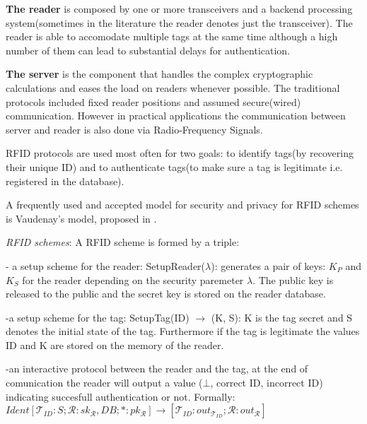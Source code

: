 \vspace*{0.1cm} 
        
        \textbf{The reader} is composed by one or more transceivers and a backend processing system(sometimes in the literature the reader denotes just the transceiver). 
    The reader is able to accomodate multiple tags at the same time although a high number of them can lead to substantial delays for authentication. 
    
\vspace*{0.1cm}

        \textbf{The server} is the component that handles the complex cryptographic calculations and eases the load on readers whenever possible. The traditional protocols
    included fixed reader positions and assumed secure(wired) communication. However in practical applications the communication between server and reader is also done via 
    Radio-Frequency Signals.

\vspace*{0.1cm}

        RFID protocols are used most often for two goals: to identify tags(by recovering their unique ID) and to authenticate tags(to make sure a tag is legitimate i.e. registered in 
    the database). 

\vspace*{0.2cm}

    A frequently used and accepted model for security and privacy for RFID schemes is Vaudenay's
    model, proposed in \cite{Vaudenay}. 

    \textit{RFID schemes}: A RFID scheme is formed by a triple:

    - a setup scheme for the reader: SetupReader($\lambda$): generates a pair of keys: $K_P$ and 
    $K_S$ for the reader depending on the security paremeter $\lambda$. The public key is released
    to the public and the secret key is stored on the reader database.

    -a setup scheme for the tag: SetupTag(ID) $\rightarrow$ (K, S): K is the tag secret and S denotes the 
    initial state of the tag. Furthermore if the tag is legitimate the values ID and K are stored
    on the memory of the reader.
    
    -an interactive protocol between the reader and the tag, at the end of comunication the reader
    will output a value ($\bot$, correct ID, incorrect ID) indicating succesfull authentication or 
    not. Formally:
    $Ident[\mathcal{T}_{ID}:S; \mathcal{R}: sk_{\mathcal{R}}, DB; *:pk_{\mathcal{R}}] \rightarrow 
    [\mathcal{T}_{ID}:out_{\mathcal{T}_{ID}}; \mathcal{R}:out_{\mathcal{R}}]$

